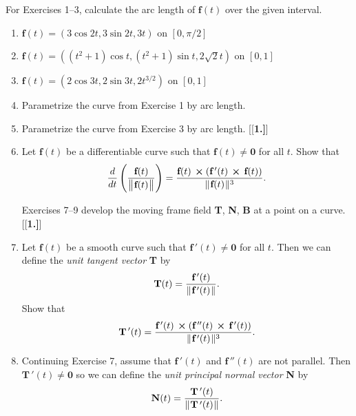 \startexercises\label{sec1dot9}
\par\noindent For Exercises 1--3, calculate the arc length of $\textbf{f}(t)$ over the given interval.
\begin{enumerate}[\bfseries 1.]
 \item $\textbf{f}(t) = (3\cos 2t, 3\sin 2t, 3t)$ on $[0,\pi/2]$
 \item $\textbf{f}(t) = ((t^2 + 1)\cos t, (t^2 + 1)\sin t, 2\sqrt{2} t)$ on $[0,1]$
 \item $\textbf{f}(t) = (2\cos 3t, 2\sin 3t, 2t^{3/2})$ on $[0,1]$
 \item Parametrize the curve from Exercise 1 by arc length.
 \item Parametrize the curve from Exercise 3 by arc length.
[{[\bfseries 1.]}]
 \item Let $\textbf{f}(t)$ be a differentiable curve such that $\textbf{f}(t) \ne \textbf{0}$ for all $t$. Show that
  \begin{displaymath}
   \frac{d}{dt} \left( \dfrac{\textbf{f}(t)}{\bigl\lVert\mspace{1mu}\textbf{f}(t)\mspace{1mu}\bigr\rVert} \right) =
    \dfrac{\textbf{f}(t)\, \bm{\times} (\textbf{f}\,'(t)\, \bm{\times} \,\textbf{f}(t))}{\lVert\mspace{1mu}\textbf{f}(t)\mspace{1mu}\rVert^3} .
  \end{displaymath}
\par\noindent Exercises 7--9 develop the moving frame field \textbf{T}, \textbf{N}, \textbf{B} at a point on a
curve.
[{[\bfseries 1.]}]
 \item Let $\textbf{f}(t)$ be a smooth curve such that $\textbf{f}\,'(t) \ne \textbf{0}$ for all $t$. Then we can
  define the \emph{unit tangent vector} \textbf{T} by
  \begin{displaymath}
   \textbf{T}(t) = \dfrac{\textbf{f}\,'(t)}{\lVert\mspace{1mu}\textbf{f}\,'(t)\mspace{1mu}\rVert} .
  \end{displaymath}
  Show that
  \begin{displaymath}
   \textbf{T}\,'(t) = \dfrac{\textbf{f}\,'(t)\, \bm{\times} (\textbf{f}\,''(t)\, \bm{\times} \,\textbf{f}\,'(t))}{
    \lVert\mspace{1mu}\textbf{f}\,'(t)\mspace{1mu}\rVert^3} .
  \end{displaymath}
 \item Continuing Exercise 7, assume that $\textbf{f}\,'(t)$ and $\textbf{f}\,''(t)$ are not parallel.
  Then $\textbf{T}\,'(t) \ne \textbf{0}$ so we can define the \emph{unit principal normal vector} \textbf{N} by
  \begin{displaymath}
   \textbf{N}(t) = \dfrac{\textbf{T}\,'(t)}{\norm{\textbf{T}\,'(t)}} .

\end{displaymath}
\end{enumerate}
